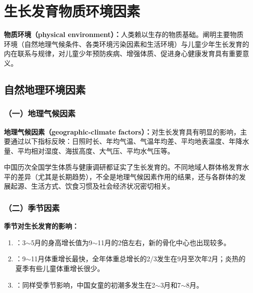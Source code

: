\section{生长发育物质环境因素}

\begin{defbox}
\textbf{物质环境（physical environment）：}人类赖以生存的物质基础。阐明主要物质环境（自然地理气候条件、各类环境污染因素和生活环境）与儿童少年生长发育的内在联系与规律，对儿童少年预防疾病、增强体质、促进身心健康发育具有重要意义。
\end{defbox}

\subsection{自然地理环境因素}

\subsubsection{（一）地理气候因素}

\begin{keybox}
\textbf{地理气候因素（geographic-climate factors）：}对生长发育具有明显的影响，主要通过以下指标反映：日照时长、年均气温、气温年均差、平均地表温度、年降水量、平均相对湿度、海拔高度、大气压、平均水气压等。

中国历次全国学生体质与健康调研都证实了生长发育的。不同地域人群体格发育水平的差异（尤其是长期趋势），不全是地理气候因素作用的结果，还与各群体的发展起源、生活方式、饮食习惯及社会经济状况密切相关。
\end{keybox}

\subsubsection{（二）季节因素}

\begin{keybox}
\textbf{季节对生长发育的影响：}
\begin{enumerate}[leftmargin=*]
    \item {}：3$\sim$5月的身高增长值为9$\sim$11月的2倍左右，新的骨化中心也出现较多。
    \item {}：9$\sim$11月体重增长最快，全年体重总增长的2/3发生在9月至次年2月；炎热的夏季有些儿童体重增长很少。
    \item {}：同样受季节影响，中国女童的初潮多发生在2$\sim$3月和7$\sim$8月。
\end{enumerate}
\end{keybox}


